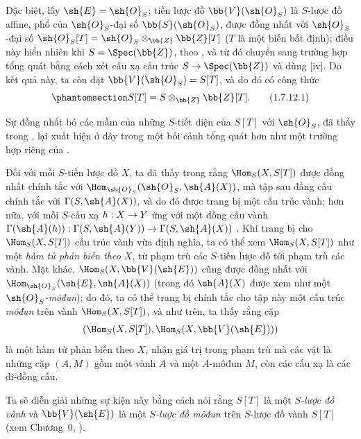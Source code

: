 \documentclass[oneside,10pt]{amsart}
\makeatletter
\newcommand{\ega@arrow}[2]{\mathchoice{#1}{#2}{#2}{#2}}
\renewcommand{\to}{\ega@arrow{\longrightarrow}{\rightarrow}}
\newcommand{\oldpage}[2][]{\marginnote{\normalfont\footnotesize\textbf{#1}~|~#2}\ignorespaces}
\let\EGAOriginalLabel\label
\renewcommand{\label}[1]{\phantomsection\EGAOriginalLabel{#1}}
\makeatother
\begin{document}
\begin{env}[1.7.12]
\label{II.1.7.12}
Đặc biệt, lấy $\sh{E}=\sh{O}_S$; tiền lược đồ $\bb{V}(\sh{O}_S)$ là $S$-lược đồ affine, phổ của $\sh{O}_S$-đại số $\bb{S}(\sh{O}_S)$, được đồng nhất với $\sh{O}_S$-đại số $\sh{O}_S[T]=\sh{O}_S\otimes_\bb{Z}\bb{Z}[T]$
\oldpage[II]{18}
($T$ là một biến bất định); điều này hiển nhiên khi $S=\Spec(\bb{Z})$, theo , và từ đó chuyển sang trường hợp tổng quát bằng cách xét cấu xạ cấu trúc $S\to\Spec(\bb{Z})$ và dùng [iv].
Do kết quả này, ta còn đặt $\bb{V}(\sh{O}_S)=S[T]$, và do đó có công thức
\[
\label{II.1.7.12.1}
  S[T]=S\otimes_\bb{Z}\bb{Z}[T].
  \tag{1.7.12.1}
\]

Sự đồng nhất bó các mầm của những $S$-tiết diện của $S[T]$ với $\sh{O}_S$, đã thấy trong , lại xuất hiện ở đây trong một bối cảnh tổng quát hơn như một trường hợp riêng của .
\end{env}

\begin{env}[1.7.13]
\label{II.1.7.13}
Đối với mỗi $S$-tiền lược đồ $X$, ta đã thấy trong  rằng $\Hom_S(X,S[T])$ được đồng nhất chính tắc với $\Hom_{\sh{O}_S}(\sh{O}_S,\sh{A}(X))$, mà tập sau đẳng cấu chính tắc với $\Gamma(S,\sh{A}(X))$, và do đó được trang bị một cấu trúc vành; hơn nữa, với mỗi $S$-cấu xạ $h:X\to Y$ ứng với một đồng cấu vành $\Gamma(\sh{A}(h)):\Gamma(S,\sh{A}(Y))\to\Gamma(S,\sh{A}(X))$ .
Khi trang bị cho $\Hom_S(X,S[T])$ cấu trúc vành vừa định nghĩa, ta có thể xem $\Hom_S(X,S[T])$ như một \emph{hàm tử phản biến theo $X$}, từ phạm trù các $S$-tiền lược đồ tới phạm trù các vành.
Mặt khác, $\Hom_S(X,\bb{V}(\sh{E}))$ cũng được đồng nhất với $\Hom_{\sh{O}_S}(\sh{E},\sh{A}(X))$ (trong đó $\sh{A}(X)$ được xem như một \emph{$\sh{O}_S$-môđun}); do đó, ta có thể trang bị chính tắc cho tập này một cấu trúc \emph{môđun} trên vành $\Hom_S(X,S[T])$, và như trên, ta thấy rằng cặp
\[
  (\Hom_S(X,S[T]),\Hom_S(X,\bb{V}(\sh{E})))
\]
là một hàm tử phản biến theo $X$, nhận giá trị trong phạm trù mà các vật là những cặp $(A,M)$ gồm một vành $A$ và một $A$-môđun $M$, còn các cấu xạ là các di-đồng cấu.

Ta sẽ diễn giải những sự kiện này bằng cách nói rằng $S[T]$ là một \emph{$S$-lược đồ vành} và $\bb{V}(\sh{E})$ là một \emph{$S$-lược đồ môđun} trên $S$-lược đồ vành $S[T]$ (xem Chương~0, ).
\end{env}
\end{document}
